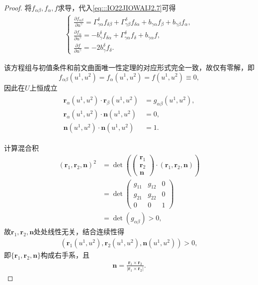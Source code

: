 \documentclass[../../main.tex]{subfiles}%
\begin{document}
\begin{proof}
将$f_{\alpha\beta},f_\alpha,f$求导，代入\eqref{eq:::IO22JIOWAIJ2.7}可得
\begin{align}
\begin{cases}
\displaystyle\frac{\partial f_{\alpha\beta}}{\partial u^\gamma} = \Gamma^\delta_{\gamma\alpha}f_{\delta\beta}+\Gamma^\delta_{\gamma\beta}f_{\delta\alpha}+b_{\gamma\alpha}f_\beta+b_{\gamma\beta}f_\alpha,\\[6pt]
\displaystyle\frac{\partial f_\alpha}{\partial u^\gamma} = -b^\delta_\gamma f_{\delta\alpha}+\Gamma^\delta_{\gamma\alpha}f_\delta+b_{\gamma\alpha}f,\\[6pt]
\displaystyle\frac{\partial f}{\partial u^\gamma} = -2b^\delta_\gamma f_\delta.
\end{cases}
\label{eq:::IO22JIOWAIJ2.13}
\end{align}

该方程组与初值条件和前文曲面唯一性定理的对应形式完全一致，故仅有零解，即
$$f_{\alpha\beta}(u^1,u^2)=f_\alpha(u^1,u^2)=f(u^1,u^2) \equiv 0,$$
因此在$U$上恒成立
\begin{align}
\begin{split}
\boldsymbol{r}_\alpha(u^1,u^2) \cdot \boldsymbol{r}_\beta(u^1,u^2) &= g_{\alpha\beta}(u^1,u^2),\\
\boldsymbol{r}_\alpha(u^1,u^2) \cdot \boldsymbol{n}(u^1,u^2) &= 0,\\
\boldsymbol{n}(u^1,u^2) \cdot \boldsymbol{n}(u^1,u^2) &= 1.
\end{split}
\label{eq:::IO22JIOWAIJ2.14}
\end{align}

计算混合积
\begin{align*}
(\boldsymbol{r}_1,\boldsymbol{r}_2,\boldsymbol{n})^2 &= \det\left(\begin{pmatrix}\boldsymbol{r}_1\\\boldsymbol{r}_2\\\boldsymbol{n}\end{pmatrix} \cdot (\boldsymbol{r}_1,\boldsymbol{r}_2,\boldsymbol{n})\right)\\
&= \det\begin{pmatrix}g_{11}&g_{12}&0\\g_{21}&g_{22}&0\\0&0&1\end{pmatrix}\\
&= \det(g_{\alpha\beta}) > 0,
\end{align*}
故$\boldsymbol{r}_1,\boldsymbol{r}_2,\boldsymbol{n}$处处线性无关，结合连续性得
\begin{align}
(\boldsymbol{r}_1(u^1,u^2),\boldsymbol{r}_2(u^1,u^2),\boldsymbol{n}(u^1,u^2)) > 0,
\label{eq:::IO22JIOWAIJ2.15}
\end{align}
即$\{\boldsymbol{r}_1,\boldsymbol{r}_2,\boldsymbol{n}\}$构成右手系，且
\begin{align}
\boldsymbol{n} = \frac{\boldsymbol{r}_1 \times \boldsymbol{r}_2}{|\boldsymbol{r}_1 \times \boldsymbol{r}_2|}.
\label{eq:::IO22JIOWAIJ2.16}
\end{align}


\end{proof}
\end{document}

